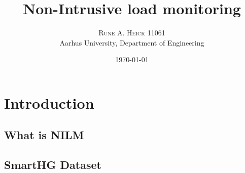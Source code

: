 


\title{\vspace{-15mm}\fontsize{24pt}{10pt}\selectfont\textbf{Non-Intrusive load monitoring}} %

\author{
\large
\textsc{Rune A. Heick 11061}\\[2mm] %
\normalsize Aarhus University, Department of Engineering \\ %
\vspace{-5mm}
}
\date{\today}

\makeglossaries

\setlength{\abovedisplayskip}{1cm}
\setlength{\belowdisplayskip}{.8cm}
\maketitle %
\newpage\null\thispagestyle{empty}\newpage
\setcounter{page}{1}
\begin{abstract}
\lipsum[7] %
\end{abstract}

\printglossary[type=\acronymtype,title=Abbreviations]
\newpage
\listoffigures
\listoftables
\newpage
\tableofcontents


\chapter{Introduction}
\lipsum[1] %
\section{What is NILM}
\lipsum[4] %
\section{SmartHG Dataset}
\lipsum[3] %

